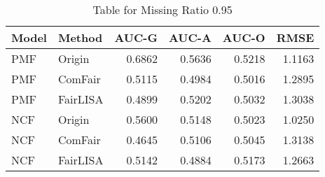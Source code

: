 \begin{table}
\centering
\caption{Table for Missing Ratio 0.95}
\label{tab:missing_0.95}
\begin{tabular}{llrrrr}
\toprule
Model &   Method &  AUC-G &  AUC-A &  AUC-O &   RMSE \\
\midrule
  PMF &   Origin & 0.6862 & 0.5636 & 0.5218 & 1.1163 \\
  PMF &  ComFair & 0.5115 & 0.4984 & 0.5016 & 1.2895 \\
  PMF & FairLISA & 0.4899 & 0.5202 & 0.5032 & 1.3038 \\
  NCF &   Origin & 0.5600 & 0.5148 & 0.5023 & 1.0250 \\
  NCF &  ComFair & 0.4645 & 0.5106 & 0.5045 & 1.3138 \\
  NCF & FairLISA & 0.5142 & 0.4884 & 0.5173 & 1.2663 \\
\bottomrule
\end{tabular}
\end{table}
